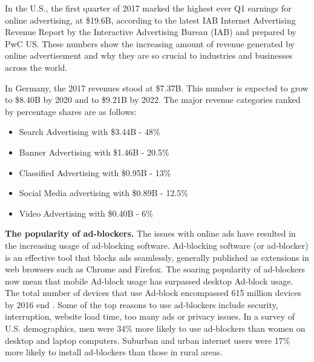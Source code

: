 \documentclass[runningheads,a4paper]{llncs}
\begin{document}
In the U.S., the first quarter of 2017 marked the highest ever Q1 earnings for online advertising, at \$19.6B, according to the latest IAB Internet Advertising Revenue Report by the Interactive Advertising Bureau (IAB) and prepared by PwC US. These numbers show the increasing amount of revenue generated by online advertisement and why they are so crucial to industries and businesses across the world.

In Germany, the 2017 revenues stood at \$7.37B. This number is expected to grow to \$8.40B by 2020 and to \$9.21B by 2022. The major revenue categories ranked by percentage shares are as follows:
\begin{itemize}
	\item Search Advertising with \$3.44B - 48\%
	\item Banner Advertising with \$1.46B - 20.5\%
    \item Classified Advertising with \$0.95B - 13\%
    \item Social Media advertising with \$0.89B - 12.5\%
    \item Video Advertising with \$0.40B - 6\%
\end{itemize}

\textbf{The popularity of ad-blockers.} The issues with online ads have resulted in the increasing usage of ad-blocking software. Ad-blocking software (or ad-blocker) is an effective tool that blocks ads seamlessly, generally published as extensions in web browsers such as Chrome and Firefox. The soaring popularity of ad-blockers now mean that mobile Ad-block usage has surpassed desktop Ad-block usage. The total number of devices that use Ad-block encompassed 615 million devices by 2016 end \cite{popularity2017}. Some of the top reasons to use ad-blockers include security, interruption, website load time, too many ads or privacy issues. In a survey of U.S. demographics, men were 34\% more likely to use ad-blockers than women on desktop and laptop computers. Suburban and urban internet users were 17\% more likely to install ad-blockers than those in rural areas.
\end{document}
